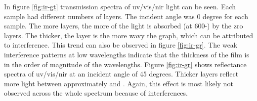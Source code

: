 In figure \ref{fig:ir-gt} transmission spectra of \gls{uv}/\gls{vis}/\gls{nir} light can be seen. 
Each sample had different numbers of layers. 
The incident angle was 0 degree for each sample.
The more layers, the more of the light is absorbed (at 600-) by the \gls{zro} layers. 
The thicker, the layer is the more wavy the graph, which can be attributed to interference.
This trend can also be observed in figure \ref{fig:ir-gr}.
The weak interference patterns at low wavelengths indicate that the thickness of the film is in the order of magnitude of the wavelengths\cite{delimafilho2017film}. 
%
Figure \ref{fig:ir-gr} shows reflectance spectra of \gls{uv}/\gls{vis}/\gls{nir} at an incident angle of 45 degrees. 
Thicker layers reflect more light between approximately  and . 
Again, this effect is most likely not observed across the whole spectrum because of interferences. 


